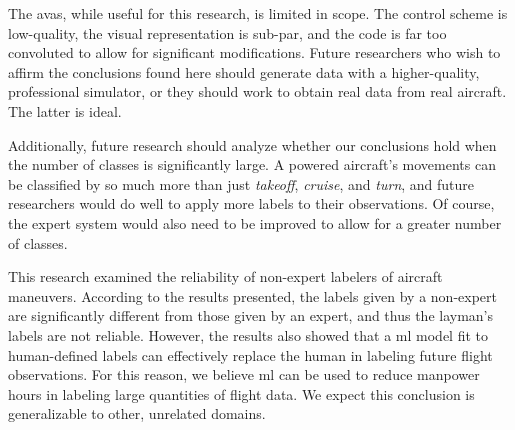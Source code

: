 \documentclass[../main.tex]{subfiles}
\begin{document}

The \ac{avas}, while useful for this research, is limited in scope. The control scheme is low-quality, the visual representation is sub-par, and the code is far too convoluted to allow for significant modifications. Future researchers who wish to affirm the conclusions found here should generate data with a higher-quality, professional simulator, or they should work to obtain real data from real aircraft. The latter is ideal.

Additionally, future research should analyze whether our conclusions hold when the number of classes is significantly large. A powered aircraft's movements can be classified by so much more than just \textit{takeoff}, \textit{cruise}, and \textit{turn}, and future researchers would do well to apply more labels to their observations. Of course, the expert system would also need to be improved to allow for a greater number of classes.


This research examined the reliability of non-expert labelers of aircraft maneuvers. According to the results presented, the labels given by a non-expert are significantly different from those given by an expert, and thus the layman's labels are not reliable. However, the results also showed that a \acl{ml} model fit to human-defined labels can effectively replace the human in labeling future flight observations. For this reason, we believe \ac{ml} can be used to reduce manpower hours in labeling large quantities of flight data. We expect this conclusion is generalizable to other, unrelated domains.
\end{document}
